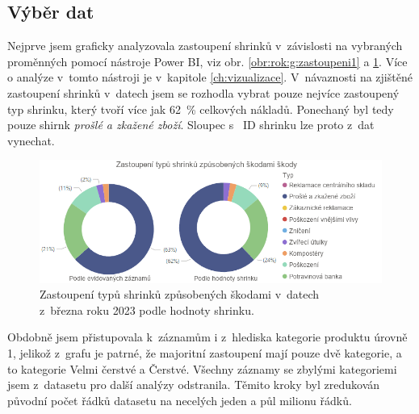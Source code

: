 

\subsection{Výběr dat}

Nejprve jsem graficky analyzovala zastoupení shrinků v~závislosti na vybraných proměnných pomocí nástroje Power BI, viz obr. \ref*{obr:rok:g:zastoupeni1} a \ref*{obr:rok:g:zastoupenish1}. Více o analýze v~tomto nástroji je v~kapitole \ref{ch:vizualizace}. V~návaznosti na zjištěné zastoupení shrinků v~datech jsem se rozhodla vybrat pouze nejvíce zastoupený typ shrinku, který tvoří více jak 62~\% celkových nákladů. Ponechaný byl tedy pouze shirnk \emph{prošlé a zkažené zboží}. Sloupec s~ ID shrinku lze proto z~dat vynechat.

\begin{figure}[h!]
    \centering
    \captionsetup{justification=centering}
    \includegraphics[width=\textwidth]{obrazky/grafy/zastoupenishrinky.png}
    \caption{Zastoupení typů shrinků způsobených škodami v~datech \\ z~března roku 2023 podle hodnoty shrinku.}
    \label{obr:rok:g:zastoupenish1}
\end{figure}

Obdobně jsem přistupovala k~záznamům i z~hlediska kategorie produktu úrovně 1, jelikož z~grafu je patrné, že majoritní zastoupení mají pouze dvě kategorie, a to kategorie Velmi čerstvé a Čerstvé. Všechny záznamy se zbylými kategoriemi jsem z~datasetu pro další analýzy odstranila. Těmito kroky byl zredukován původní počet řádků datasetu na %
necelých jeden a půl milionu řádků.

